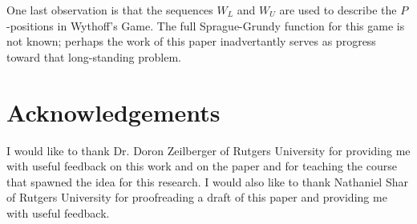 \documentclass[english,12pt]{article}
\begin{document}
One last observation is that the sequences $W_L$ and $W_U$ are used to describe the $P$-positions in Wythoff's Game.  The full Sprague-Grundy function for this game is not known; perhaps the work of this paper inadvertantly serves as progress toward that long-standing problem.
\section{Acknowledgements}
I would like to thank Dr. Doron Zeilberger of Rutgers University for providing me with useful feedback on this work and on the paper and for teaching the course that spawned the idea for this research.  I would also like to thank Nathaniel Shar of Rutgers University for proofreading a draft of this paper and providing me with useful feedback.
%
%
%
%
%
\appendix
\end{document}
